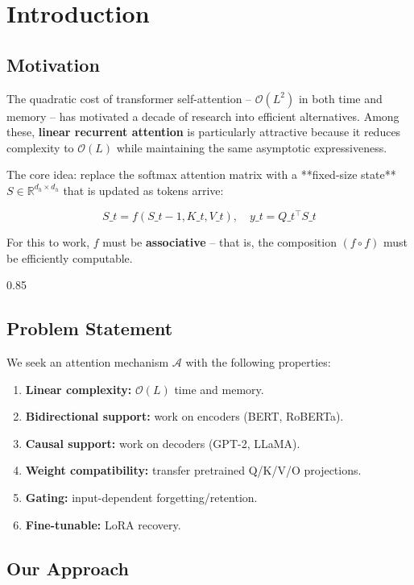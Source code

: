 
\section{Introduction}

\subsection{Motivation}

The quadratic cost of transformer self-attention -- $\mathcal{O}(L^2)$ in 
both time and memory -- has motivated a decade of research into efficient 
alternatives. Among these, \textbf{linear recurrent attention} is particularly 
attractive because it reduces complexity to $\mathcal{O}(L)$ while 
maintaining the same asymptotic expressiveness.

The core idea: replace the softmax attention matrix with a **fixed-size 
state** $S \in \mathbb{R}^{d_h \times d_h}$ that is updated as tokens arrive:

\[
S\_t = f(S\_{t-1}, K\_t, V\_t), \quad y\_t = Q\_t^\top S\_t
\tag{1.1}
\]

For this to work, $f$ must be \textbf{associative} -- that is, the composition 
$(f \circ f)$ must be efficiently computable.

0.85


\subsection{Problem Statement}

We seek an attention mechanism $\mathcal{A}$ with the following properties:

\begin{enumerate}
\item \textbf{Linear complexity:} $\mathcal{O}(L)$ time and memory.
\item \textbf{Bidirectional support:} work on encoders (BERT, RoBERTa).
\item \textbf{Causal support:} work on decoders (GPT-2, LLaMA).
\item \textbf{Weight compatibility:} transfer pretrained Q/K/V/O projections.
\item \textbf{Gating:} input-dependent forgetting/retention.
\item \textbf{Fine-tunable:} LoRA recovery.

\end{enumerate}
\subsection{Our Approach}

